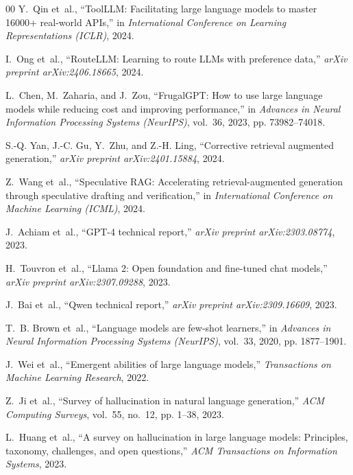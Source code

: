 \documentclass[conference,onecolumn,10pt]{IEEEtran}
\begin{document}
\begin{thebibliography}{00}
Y.~Qin et~al., ``Tool{LLM}: Facilitating large language models to master 16000+ real-world {APIs},'' in \textit{International Conference on Learning Representations (ICLR)}, 2024.

I.~Ong et~al., ``Route{LLM}: Learning to route {LLMs} with preference data,'' \textit{arXiv preprint arXiv:2406.18665}, 2024.

L.~Chen, M.~Zaharia, and J.~Zou, ``Frugal{GPT}: How to use large language models while reducing cost and improving performance,'' in \textit{Advances in Neural Information Processing Systems (NeurIPS)}, vol.~36, 2023, pp. 73982--74018.

S.-Q. Yan, J.-C. Gu, Y.~Zhu, and Z.-H. Ling, ``Corrective retrieval augmented generation,'' \textit{arXiv preprint arXiv:2401.15884}, 2024.

Z.~Wang et~al., ``Speculative {RAG}: Accelerating retrieval-augmented generation through speculative drafting and verification,'' in \textit{International Conference on Machine Learning (ICML)}, 2024.

J.~Achiam et~al., ``{GPT-4} technical report,'' \textit{arXiv preprint arXiv:2303.08774}, 2023.

H.~Touvron et~al., ``Llama 2: Open foundation and fine-tuned chat models,'' \textit{arXiv preprint arXiv:2307.09288}, 2023.

J.~Bai et~al., ``Qwen technical report,'' \textit{arXiv preprint arXiv:2309.16609}, 2023.

T.~B. Brown et~al., ``Language models are few-shot learners,'' in \textit{Advances in Neural Information Processing Systems (NeurIPS)}, vol.~33, 2020, pp. 1877--1901.

J.~Wei et~al., ``Emergent abilities of large language models,'' \textit{Transactions on Machine Learning Research}, 2022.

Z.~Ji et~al., ``Survey of hallucination in natural language generation,'' \textit{ACM Computing Surveys}, vol.~55, no.~12, pp. 1--38, 2023.

L.~Huang et~al., ``A survey on hallucination in large language models: Principles, taxonomy, challenges, and open questions,'' \textit{ACM Transactions on Information Systems}, 2023.


\end{thebibliography}
\end{document}
